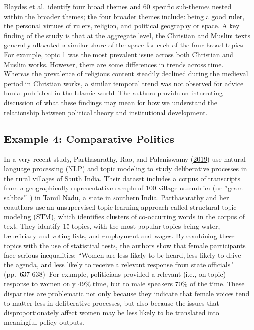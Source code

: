 \documentclass{book}
\begin{document}
Blaydes et al.~identify four broad themes and 60 specific sub-themes nested
within the broader themes; the four broader themes include: being a good
ruler, the personal virtues of rulers, religion, and political geography or
space. A key finding of the study is that at the aggregate level, the
Christian and Muslim texts generally allocated a similar share of the space
for each of the four broad topics. For example, topic 1 was the most prevalent
issue across both Christian and Muslim works. However, there are some
differences in trends across time. Whereas the prevalence of religious content
steadily declined during the medieval period in Christian works, a similar
temporal trend was not observed for advice books published in the Islamic
world. The authors provide an interesting discussion of what these findings
may mean for how we understand the relationship between political theory and
institutional development.

\hypertarget{example-4-comparative-politics}{%
\subsection{Example 4: Comparative
Politics}\label{example-4-comparative-politics}}

In a very recent study, Parthasarathy, Rao, and Palaniswamy
(\protect\hyperlink{ref-parthasarathy2019a}{2019}) use natural language
processing (NLP) and topic modeling to study deliberative processes in the
rural villages of South India. Their dataset includes a corpus of transcripts
from a geographically representative sample of 100 village assemblies (or
\("\)gram sahbas\("\) ) in Tamil Nadu, a state in southern India.
Parthasarathy and her coauthors use an unsupervised topic learning approach
called structural topic modeling (STM), which identifies clusters of
co-occurring words in the corpus of text. They identify 15 topics, with the
most popular topics being water, beneficiary and voting lists, and employment
and wages. By combining these topics with the use of statistical tests, the
authors show that female participants face serious inequalities: ``Women are
less likely to be heard, less likely to drive the agenda, and less likely to
receive a relevant response from state officials'' (pp.~637-638). For example,
politicians provided a relevant (i.e., on-topic) response to women only
49\(\%\) time, but to male speakers 70\(\%\) of the time. These disparities
are problematic not only because they indicate that female voices tend to
matter less in deliberative processes, but also because the issues that
disproportionately affect women may be less likely to be translated into
meaningful policy outputs.
\end{document}
